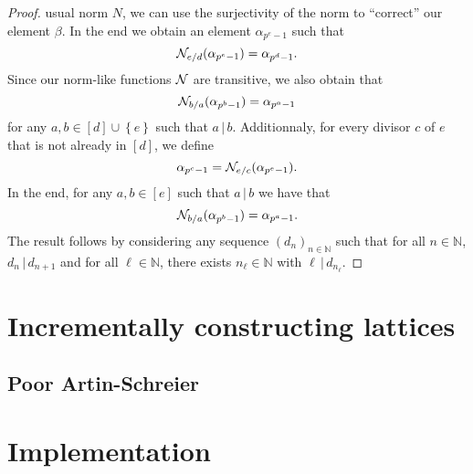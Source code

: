 \documentclass{sig-alternate}
\begin{document}
\begin{proof}
usual norm $N$, we can use
the surjectivity of the norm to ``correct'' our element $\beta$. In the end we
obtain an element $\alpha_{p^{e}-1}$ such
that
\[
  \mathcal{N}_{e/d}(\alpha_{p^{e}-1}) = \alpha_{p^{d}-1}.
\]
Since our norm-like functions $\mathcal{N}$ are transitive, we also obtain that
\[
  \mathcal{N}_{b/a}(\alpha_{p^b-1})=\alpha_{p^a-1}
\]
for any $a,b\in \left[ d \right]\cup\left\{ e \right\}$ such that
$a\,|\,b$. Additionnaly, for every divisor $c$ of $e$ that is not already in $\left[
d \right]$, we define
\[
  \alpha_{p^c-1}=\mathcal{N}_{e/c}(\alpha_{p^{e}-1}).
\]
In the end, for any $a, b\in\left[ e \right]$ such that
$a\,|\,b$ we have that
\[
  \mathcal{N}_{b/a}(\alpha_{p^b-1})=\alpha_{p^a-1}.
\]
The result follows by considering any sequence $(d_n)_{n\in\mathbb{N}}$ such
that for all $n\in\mathbb{N}$, $d_n\,|\,d_{n+1}$ and for all
$\ell\in\mathbb{N}$, there exists $n_\ell\in\mathbb{N}$ with
$\ell\,|\,d_{n_\ell}$.
\end{proof}


\section{Incrementally constructing lattices}
\label{sec:construction}

\subsection{Poor Artin-Schreier}


\section{Implementation}
\label{sec:implementation}



\end{document}

